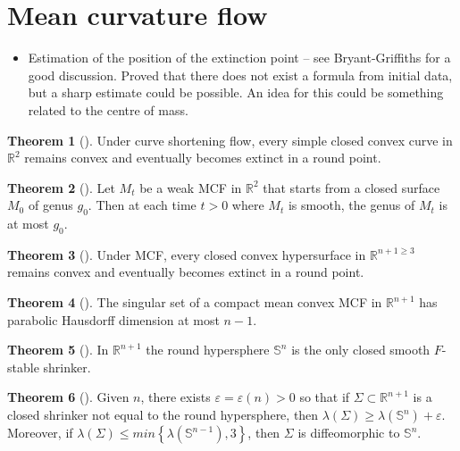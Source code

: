 \documentclass{amsart}
\theoremstyle{definition}
\newtheorem{Thm}{Theorem}[section]
\begin{document}
\section{Mean curvature flow}
\begin{refsection}

\begin{itemize}
\item Estimation of the position of the extinction point -- see Bryant-Griffiths for a good discussion. Proved that there does not exist a formula from initial data, but a sharp estimate could be possible. An idea for this could be something related to the centre of mass.
\end{itemize}

\begin{Thm}[\cite{GageHamilton1986}]
Under curve shortening flow, every simple closed convex curve in ${\mathbb{R}}^{2}$ remains convex and eventually becomes extinct in a round point.
\end{Thm}

\begin{Thm}[\cite{White1995}]
Let ${M}_{t}$ be a weak MCF in ${\mathbb{R}}^{2}$ that starts from a closed surface ${M}_{0}$ of genus $g_0$. Then at each time $t > 0$ where ${M}_{t}$ is smooth, the genus of  ${M}_{t}$ is at most $g_0$.
\end{Thm}

\begin{Thm}[\cite{Huisken1984}]
Under MCF, every closed convex hypersurface in ${\mathbb{R}}^{n+1 \geq 3}$ remains convex and eventually becomes extinct in a round point.
\end{Thm}
 
\begin{Thm}[\cite{White2000}]
The singular set of a compact mean convex MCF in ${\mathbb{R}}^{n+1}$ has parabolic Hausdorff dimension at most $n-1$.
\end{Thm}

\begin{Thm}[\cite{ColdingMinicozzi2012}]
In ${\mathbb{R}}^{n+1}$ the round hypersphere ${\mathbb{S}}^{n}$ is the only closed smooth $F$-stable shrinker.
\end{Thm}

\begin{Thm}[\cite{ColdingIlmanenMinicozziWhite2013}] \label{Colding Ilmanen Minicozzi White 2013}
Given $n$, there exists  $\varepsilon = \varepsilon(n) > 0$ so that if $\Sigma \subset {\mathbb{R}}^{n+1}$
is a closed shrinker not equal to the round hypersphere, then $\lambda\left(\Sigma\right) \geq \lambda\left({\mathbb{S}}^{n}\right) + \varepsilon$. Moreover,
if $\lambda\left(\Sigma\right) \leq min \left\{  \lambda \left({\mathbb{S}}^{n-1}\right) , 3 \right\}$, then $\Sigma$ is diffeomorphic to ${\mathbb{S}}^{n}$.
\end{Thm}
 

\end{refsection}
\end{document}

